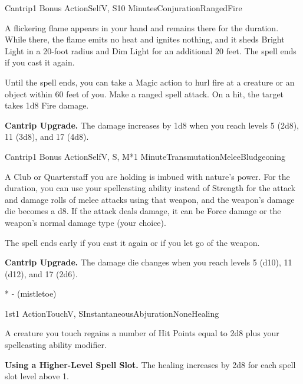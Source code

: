 

\pagestyle{empty}


\begin{Spell}{Cantrip}{1 Bonus Action}{Self}{V, S}{10 Minutes}{Conjuration}{Ranged}{Fire}

A flickering flame appears in your hand and remains there for the duration. While there, the flame emits no heat and ignites nothing, and it sheds Bright Light in a 20-foot radius and Dim Light for an additional 20 feet. The spell ends if you cast it again.

Until the spell ends, you can take a Magic action to hurl fire at a creature or an object within 60 feet of you. Make a ranged spell attack. On a hit, the target takes 1d8 Fire damage.

\textbf{Cantrip Upgrade.} The damage increases by 1d8 when you reach levels 5 (2d8), 11 (3d8), and 17 (4d8).

\end{Spell}


\begin{Spell}{Cantrip}{1 Bonus Action}{Self}{V, S, M*}{1 Minute}{Transmutation}{Melee}{Bludgeoning}

A Club or Quarterstaff you are holding is imbued with nature's power. For the duration, you can use your spellcasting ability instead of Strength for the attack and damage rolls of melee attacks using that weapon, and the weapon's damage die becomes a d8. If the attack deals damage, it can be Force damage or the weapon's normal damage type (your choice).

The spell ends early if you cast it again or if you let go of the weapon.

\textbf{Cantrip Upgrade.} The damage die changes when you reach levels 5 (d10), 11 (d12), and 17 (2d6).

* - (mistletoe)
\end{Spell}


\begin{Spell}{1st}{1 Action}{Touch}{V, S}{Instantaneous}{Abjuration}{None}{Healing}

A creature you touch regains a number of Hit Points equal to 2d8 plus your spellcasting ability modifier.

\textbf{Using a Higher-Level Spell Slot.} The healing increases by 2d8 for each spell slot level above 1.

\end{Spell}

